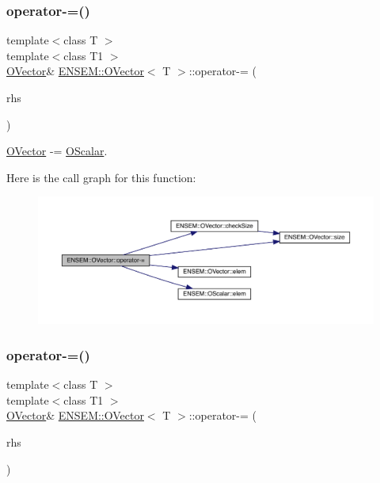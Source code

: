 \subsubsection{\texorpdfstring{operator-\/=()}{operator-=()}\hspace{0.1cm}{\footnotesize\ttfamily [1/4]}}
{\footnotesize\ttfamily template$<$class T $>$ \\
template$<$class T1 $>$ \\
\mbox{\hyperlink{classENSEM_1_1OVector}{O\+Vector}}\& \mbox{\hyperlink{classENSEM_1_1OVector}{E\+N\+S\+E\+M\+::\+O\+Vector}}$<$ T $>$\+::operator-\/= (\begin{DoxyParamCaption}\item[{const \mbox{\hyperlink{classENSEM_1_1OScalar}{O\+Scalar}}$<$ T1 $>$ \&}]{rhs }\end{DoxyParamCaption})\hspace{0.3cm}{\ttfamily [inline]}}



\mbox{\hyperlink{classENSEM_1_1OVector}{O\+Vector}} -\/= \mbox{\hyperlink{classENSEM_1_1OScalar}{O\+Scalar}}. 

Here is the call graph for this function\+:
\nopagebreak
\begin{figure}[H]
\begin{center}
\leavevmode
\includegraphics[width=350pt]{d0/d8d/classENSEM_1_1OVector_ae2ae62360c5eb29827cb7e3d5556859f_cgraph}
\end{center}
\end{figure}
\mbox{\label{classENSEM_1_1OVector_ae2ae62360c5eb29827cb7e3d5556859f}} 
\subsubsection{\texorpdfstring{operator-\/=()}{operator-=()}\hspace{0.1cm}{\footnotesize\ttfamily [2/4]}}
{\footnotesize\ttfamily template$<$class T $>$ \\
template$<$class T1 $>$ \\
\mbox{\hyperlink{classENSEM_1_1OVector}{O\+Vector}}\& \mbox{\hyperlink{classENSEM_1_1OVector}{E\+N\+S\+E\+M\+::\+O\+Vector}}$<$ T $>$\+::operator-\/= (\begin{DoxyParamCaption}\item[{const \mbox{\hyperlink{classENSEM_1_1OScalar}{O\+Scalar}}$<$ T1 $>$ \&}]{rhs }\end{DoxyParamCaption})\hspace{0.3cm}{\ttfamily [inline]}}



